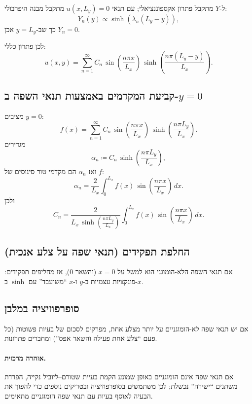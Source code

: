 ל-$Y$ מתקבל פתרון אקספוננציאלי; עם תנאי $u(x,L_y)=0$ מתקבל מבנה היפרבולי:
\begin{equation}
Y_n(y)\propto \sinh\left(\lambda_n(L_y-y)\right),
\end{equation}
כך שב-$y=L_y$ אכן $Y_n=0$.

לכן פתרון כללי:
\begin{equation}
u(x,y)=\sum_{n=1}^{\infty} C_n\,
\sin\left(\frac{n\pi x}{L_x}\right)\,
\sinh\left(\frac{n\pi (L_y-y)}{L_x}\right).
\end{equation}

\subsection{קביעת המקדמים באמצעות תנאי השפה ב-\(y=0\)}
מציבים $y=0$:
\begin{equation}
f(x)=\sum_{n=1}^{\infty} C_n\,
\sin\left(\frac{n\pi x}{L_x}\right)\,
\sinh\left(\frac{n\pi L_y}{L_x}\right).
\end{equation}
מגדירים
\[
\alpha_n \coloneqq C_n\,\sinh\left(\frac{n\pi L_y}{L_x}\right),
\]
ואז $\alpha_n$ הם מקדמי טור סינוסים של $f$:
\begin{equation}
\alpha_n=\frac{2}{L_x}\int_0^{L_x} f(x)\,
\sin\left(\frac{n\pi x}{L_x}\right)\,dx.
\end{equation}
ולכן
\begin{equation}
C_n=
\frac{2}{L_x\,\sinh\left(\frac{n\pi L_y}{L_x}\right)}
\int_0^{L_x} f(x)\,\sin\left(\frac{n\pi x}{L_x}\right)\,dx.
\end{equation}

\subsection{החלפת תפקידים (תנאי שפה על צלע אנכית)}
אם תנאי השפה הלא-הומוגני הוא למשל על $x=0$ (והשאר $0$), אז מחליפים תפקידים: פונקציות עצמיות ב-$y$ ו-$x$ ``משועבד'' עם $\sinh$ ב-$x$.

\subsection{סופרפוזיציה במלבן}
אם יש תנאי שפה לא-הומוגניים על יותר מצלע אחת, מפרקים לסכום של בעיות פשוטות (כל פעם ``צלע אחת פעילה והשאר אפס'') ומחברים פתרונות.

\paragraph{אזהרה מרכזית.}
אם תנאי שפה אינם הומוגניים באופן שמונע הקמת בעיית שטורם--ליוביל נקייה, הפרדת משתנים ``ישירה'' נכשלת; לכן משתמשים בסופרפוזיציה ובטריקים נוספים כדי להפוך את הבעיה לאוסף בעיות עם תנאי שפה הומוגניים מתאימים.

